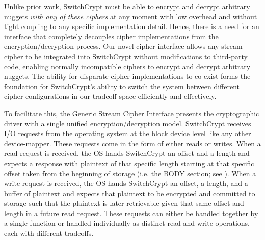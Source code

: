 Unlike prior work, SwitchCrypt must be able to encrypt and decrypt arbitrary
nuggets \emph{with any of these ciphers} at any moment with low overhead and
without tight coupling to any specific implementation detail. Hence, there is a
need for an interface that completely decouples cipher implementations from the
encryption/decryption process. Our novel cipher interface allows any stream
cipher to be integrated into SwitchCrypt without modifications to third-party
code, enabling normally incompatible ciphers to encrypt and decrypt arbitrary
nuggets. The ability for disparate cipher implementations to co-exist forms the
foundation for SwitchCrypt's ability to switch the system between different
cipher configurations in our tradeoff space efficiently and effectively.

To facilitate this, the Generic Stream Cipher Interface presents the
cryptographic driver with a single unified encryption/decryption model.
SwitchCrypt receives I/O requests from the operating system at the block device
level like any other device-mapper. These requests come in the form of either
reads or writes. When a read request is received, the OS hands SwitchCrypt an
offset and a length and expects a response with plaintext of that specific
length starting at that specific offset taken from the beginning of storage
(i.e. the BODY section; see ). When a write request is
received, the OS hands SwitchCrypt an offset, a length, and a buffer of
plaintext and expects that plaintext to be encrypted and committed to storage
such that the plaintext is later retrievable given that same offset and length
in a future read request. These requests can either be handled together by a
single function or handled individually as distinct read and write operations,
each with different tradeoffs.

